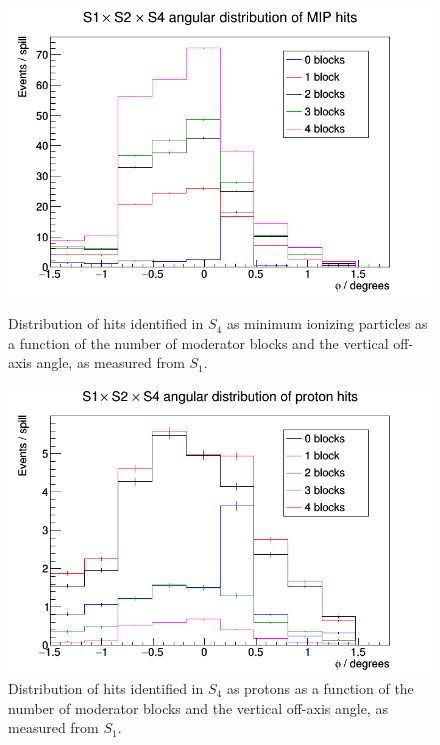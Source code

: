 \begin{figure}[ht]
   		\begin{minipage}[t]{0.48\textwidth}
   			\centering
   			\includegraphics[width=\textwidth]{files/Figures/piS4Vert}
   			\caption{Distribution of hits identified in $S_{4}$ as minimum ionizing particles as a function of the number of moderator blocks and the vertical off-axis angle, as measured from $S_{1}$.}
   		\end{minipage}
   		\hspace{0.3cm}
   		\begin{minipage}[t]{0.48\textwidth}
   			\centering
   			\includegraphics[width=\textwidth]{files/Figures/proS4Vert}
   			\caption{Distribution of hits identified in $S_{4}$ as protons as a function of the number of moderator blocks and the vertical off-axis angle, as measured from $S_{1}$.}
   		\end{minipage}
   	
	\end{figure}	
        
